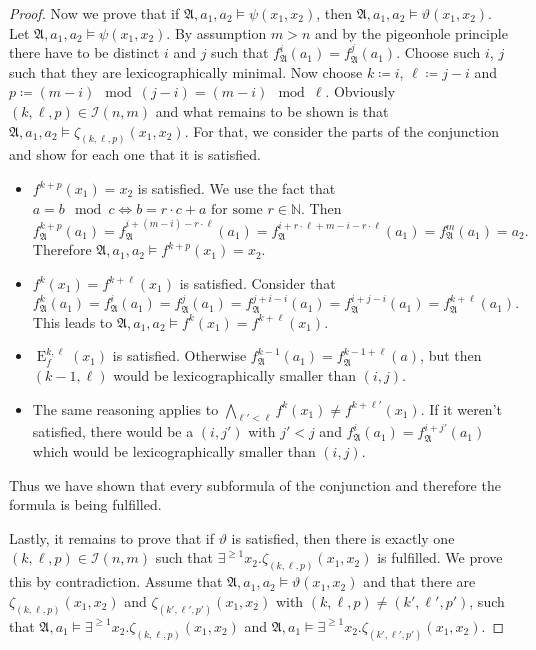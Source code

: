 \documentclass[a4paper,11pt,DIV=15]{scrartcl} %
\theoremstyle{plain}
\theoremstyle{definition}
\renewcommand{\theta}{\vartheta}
\begin{document}
\begin{proof}
	Now we prove that if $\mathfrak A,a_1,a_2 \models \psi(x_1,x_2)$, then $\mathfrak A,a_1,a_2 \models \theta(x_1,x_2)$. 
	Let $\mathfrak A,a_1,a_2\models \psi(x_1,x_2)$. By assumption $m>n$ and by the pigeonhole principle there have to be distinct $i$ and $j$ such that $f_{\mathfrak A}^{i}(a_1)=f_{\mathfrak A}^{j}(a_1)$.
	Choose such $i$, $j$ such that they are lexicographically minimal.
	Now choose $k\coloneqq i$, $\ell \coloneqq j-i$ and $p\coloneqq (m-i) \mod (j-i)= (m-i) \mod \ell$.
	Obviously $(k,\ell,p)\in\mathcal I(n,m)$ and what remains to be shown is that $\mathfrak A,a_1,a_2\models \zeta_{(k,\ell,p)}(x_1,x_2)$.
	For that, we consider the parts of the conjunction and show for each one that it is satisfied.
	
	\begin{itemize}
		\item $f^{k+p}(x_1)=x_2$ is satisfied.
		We use the fact that $a= b \mod c \Leftrightarrow b = r\cdot c +a \text{ for some } r\in \mathbb N$.
		Then
		$$f_{\mathfrak A}^{k+p}(a_1)=f_{\mathfrak A}^{i+(m-i)-r\cdot \ell}(a_1)=f_{\mathfrak A}^{i+r\cdot \ell + m -i - r\cdot \ell}(a_1)=f_{\mathfrak A}^{m}(a_1)=a_2.$$
		Therefore $\mathfrak A,a_1,a_2\models f^{k+p}(x_1)=x_2$.
		
		\item $f^{k}(x_1)=f^{k+\ell}(x_1)$ is satisfied.
		Consider that
		$$f_{\mathfrak A}^{k}(a_1)=f_{\mathfrak A}^{i}(a_1)=f_{\mathfrak A}^{j}(a_1)=f_{\mathfrak A}^{j+i-i}(a_1)=f_{\mathfrak A}^{i+j-i}(a_1)=f_{\mathfrak A}^{k+\ell}(a_1).$$
		This leads to $\mathfrak A,a_1,a_2\models f^{k}(x_1)=f^{k+\ell}(x_1)$.
		
		\item $\operatorname{E}^{k,\ell}_f(x_1)$ is satisfied.
		Otherwise $f_{\mathfrak A}^{k-1}(a_1)=f_{\mathfrak A}^{k-1+\ell}(a)$, but then $(k-1,\ell)$ would be lexicographically smaller than $(i,j)$.
		
		\item The same reasoning applies to $\bigwedge_{\ell'<\ell}f^{k}(x_1)\neq f^{k+\ell'}(x_1)$. 
		If it weren't satisfied, there would be a $(i,j')$ with $j'<j$ and $f_{\mathfrak A}^{i}(a_1)=f_{\mathfrak A}^{i+j'}(a_1)$ which would be lexicographically smaller than $(i,j)$.
	\end{itemize}
	
	Thus we have shown that every subformula of the conjunction and therefore the formula is being fulfilled.
	
	Lastly, it remains to prove that if $\theta$ is satisfied, then there is exactly one $(k,\ell,p)\in\mathcal{I}(n,m)$ such that $\exists^{\geq 1}x_2.\zeta_{(k,\ell,p)}(x_1, x_2)$ is fulfilled.
	We prove this by contradiction.
	Assume that $\mathfrak A,a_1,a_2\models \theta(x_1,x_2)$ and that there are $\zeta_{(k,\ell,p)}(x_1,x_2)$ and $\zeta_{(k',\ell',p')}(x_1,x_2)$ with $(k,\ell,p)\neq (k',\ell',p')$, such that $\mathfrak A,a_1\models \exists^{\geq 1}x_2.\zeta_{(k,\ell,p)}(x_1,x_2)$ and $\mathfrak A,a_1\models \exists^{\geq 1}x_2.\zeta_{(k',\ell',p')}(x_1,x_2)$.
	

\end{proof}
\end{document}

